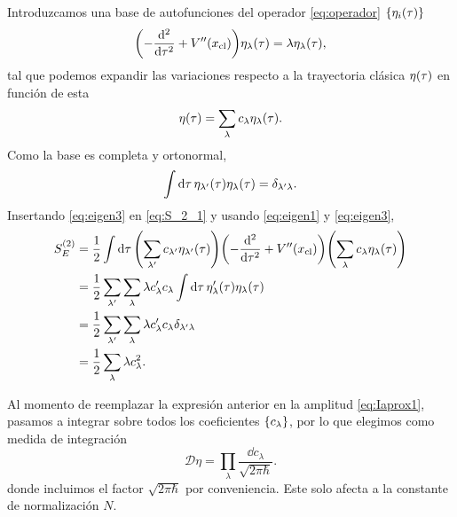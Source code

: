 Introduzcamos una base de autofunciones del operador \eqref{eq:operador} $\qty{\eta_i \qty(\tau)}$
\begin{equation} \label{eq:eigen1}
\qty( - \dv[2]{\tau} + V''\qty(x_{\text{cl}})) \eta_\lambda\qty(\tau) = \lambda \eta_\lambda\qty(\tau),
\end{equation}
tal que podemos expandir las variaciones respecto a la trayectoria clásica $\eta\qty(\tau)$ en función de esta
 \begin{equation}\label{eq:eigen3}
\eta\qty(\tau) = \sum_\lambda c_\lambda \eta_\lambda \qty(\tau). 
\end{equation}
Como la base es completa y ortonormal,
\begin{equation} \label{eq:eigen2}
\int \dd{\tau} \eta_{\lambda'}\qty(\tau) \eta_{\lambda}\qty(\tau) = \delta_{\lambda'\lambda}.
\end{equation}
Insertando \eqref{eq:eigen3} en \eqref{eq:S_2_1} y usando \eqref{eq:eigen1} y \eqref{eq:eigen3},
\begin{align}
S_E^{(2)} &= \frac{1}{2} \int \dd{\tau}\qty( \sum_{\lambda'} c_{\lambda'} \eta_{\lambda'} \qty(\tau)) \qty(-\dv[2]{\tau} + V''\qty(x_{\text{cl}})) \qty( \sum_\lambda c_\lambda \eta_\lambda \qty(\tau)) \\
&= \frac{1}{2} \sum_{\lambda'} \sum_\lambda \lambda c_\lambda' c_\lambda \int \dd{\tau} \eta_\lambda' \qty(\tau)  \eta_\lambda \qty(\tau) \\
&= \frac{1}{2} \sum_{\lambda'} \sum_\lambda \lambda c_\lambda' c_\lambda \delta_{\lambda'\lambda} \\
&= \frac{1}{2} \sum_\lambda \lambda c_\lambda^2. \label{eq:S_2_2}
\end{align}

Al momento de reemplazar la expresión anterior en la amplitud \eqref{eq:Iaprox1}, pasamos a integrar sobre todos los coeficientes $\qty{c_\lambda}$, por lo que elegimos como medida de integración 
\begin{equation}
	\mathcal{D}\eta = \prod_\lambda \frac{\dd{c_\lambda}}{\sqrt{2\pi \hbar}}.
\end{equation}
donde incluimos el factor $\sqrt{2\pi \hbar}$ por conveniencia. Este solo afecta a la constante de normalización $N$. 


